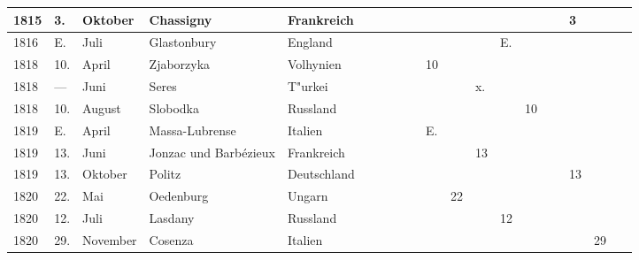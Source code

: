 \documentclass[a4paper, 8pt, oneside, polutonikogreek, german]{article}
\begin{document}
\begin{landscape}
\begin{table}[H]
\begin{longtable}{|p{5mm}|p{4mm}|p{13mm}|p{17mm}|p{17mm}|p{4mm}|p{6mm}|p{6mm}|p{6mm}|p{4mm}|p{5mm}|p{4mm}|p{5mm}|p{6mm}|p{5mm}|p{5mm}|p{5mm}|}
        1815 & 3. & Oktober & Chassigny & Frankreich & ~ & ~ & ~ & ~ & ~ & ~ & ~ & ~ & ~ & 3 & ~ & ~ \\ \hline
        1816 & E. & Juli & Glastonbury & England & ~ & ~ & ~ & ~ & ~ & ~ & E. & ~ & ~ & ~ & ~ & ~ \\ \hline
        1818 & 10. & April & Zjaborzyka & Volhynien & ~ & ~ & ~ & 10 & ~ & ~ & ~ & ~ & ~ & ~ & ~ & ~ \\ \hline
        1818 & --- & Juni & Seres & T"urkei & ~ & ~ & ~ & ~ & ~ & x. & ~ & ~ & ~ & ~ & ~ & ~ \\ \hline
        1818 & 10. & August & Slobodka & Russland & ~ & ~ & ~ & ~ & ~ & ~ & ~ & 10 & ~ & ~ & ~ & ~ \\ \hline
        1819 & E. & April & Massa-Lubrense & Italien & ~ & ~ & ~ & E. & ~ & ~ & ~ & ~ & ~ & ~ & ~ & ~ \\ \hline
        1819 & 13. & Juni & Jonzac und Barbézieux & Frankreich & ~ & ~ & ~ & ~ & ~ & 13 & ~ & ~ & ~ & ~ & ~ & ~ \\ \hline
        1819 & 13. & Oktober & Politz & Deutschland & ~ & ~ & ~ & ~ & ~ & ~ & ~ & ~ & ~ & 13 & ~ & ~ \\ \hline
        1820 & 22. & Mai & Oedenburg & Ungarn & ~ & ~ & ~ & ~ & 22 & ~ & ~ & ~ & ~ & ~ & ~ & ~ \\ \hline
        1820 & 12. & Juli & Lasdany & Russland & ~ & ~ & ~ & ~ & ~ & ~ & 12 & ~ & ~ & ~ & ~ & ~ \\ \hline
        1820 & 29. & November & Cosenza & Italien & ~ & ~ & ~ & ~ & ~ & ~ & ~ & ~ & ~ & ~ & 29 & ~ \\ \hline
    \end{longtable}
\end{table}
\vspace*{\fill}
\end{landscape}
\clearpage
\end{document}
